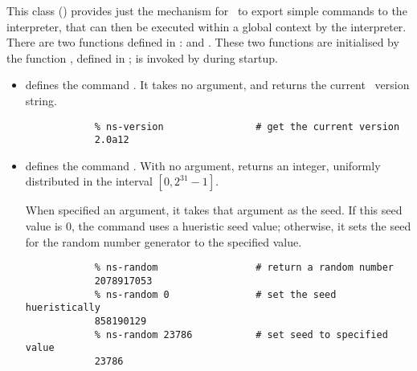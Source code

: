 \documentclass{article}
\begin{document}
This class ()
provides just the mechanism for \ns\ to export
simple commands to the interpreter, 
that can then be executed within a global context by the interpreter.
There are two functions defined in :
 and .
These two functions are initialised by the function
,
defined in ;
 is invoked by
during startup.
\begin{itemize}
\item {}
  defines the command .
  It takes no argument, and returns the current \ns\ version string.
\begin{verbatim}
            % ns-version                # get the current version
            2.0a12
\end{verbatim}

\item {}
  defines the command .
  With no argument,  returns an integer,
  uniformly distributed in the interval $[0, 2^{31}-1]$.

  When specified an argument, it takes that argument as the seed.
  If this seed value is 0, the command uses a hueristic seed value;
  otherwise, it sets the seed for the random number generator to the
  specified value.
\begin{verbatim}
            % ns-random                 # return a random number
            2078917053
            % ns-random 0               # set the seed hueristically
            858190129
            % ns-random 23786           # set seed to specified value
            23786
\end{verbatim}
\end{itemize}
\end{document}
